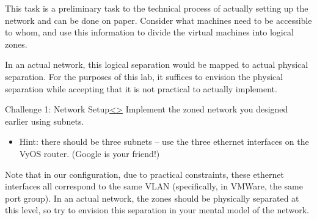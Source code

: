 \documentclass[12pt]{article}
\newenvironment{instructionblock}{\Large\bgroup}{\egroup}
\begin{document}
\par This task is a preliminary task to the technical process of actually setting up the network and can be done on paper. Consider what machines need to be accessible to whom, and use this information to divide the virtual machines into logical zones.

\par In an actual network, this logical separation would be mapped to actual physical separation. For the purposes of this lab, it suffices to envision the physical separation while accepting that it is not practical to actually implement. 



\pagebreak
\begin{slide}{Challenge 1: Network Setup}{\hyperref[slide 15]{\textless}\hyperref[slide 17]{\textgreater}}
\begin{instructionblock}
Implement the zoned network you designed earlier using subnets.
\end{instructionblock}
\end{slide}

\begin{itemize}
\item Hint: there should be three subnets -- use the three ethernet interfaces on the VyOS router. (Google is your friend!)
\end{itemize}

\par Note that in our configuration, due to practical constraints, these ethernet interfaces all correspond to the same VLAN (specifically, in VMWare, the same port group). In an actual network, the zones should be physically separated at this level, so try to envision this separation in your mental model of the network. 
\end{document}

